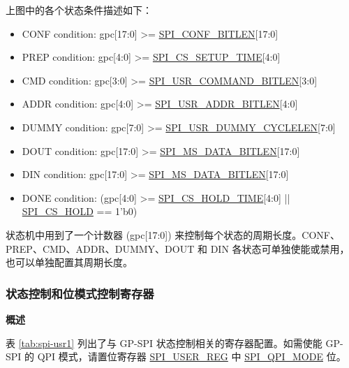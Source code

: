 \documentclass[main\_\_CN.tex]{subfiles}
\begin{document}
上图中的各个状态条件描述如下：
\begin{itemize}
    \item CONF condition: gpc[17:0] >= \hyperref[fielddesc:SPICONFBITLEN]{SPI\_CONF\_BITLEN}[17:0]
    \item PREP condition: gpc[4:0] >= \hyperref[fielddesc:SPICSSETUPTIME]{SPI\_CS\_SETUP\_TIME}[4:0]
    \item CMD condition: gpc[3:0] >= \hyperref[fielddesc:SPIUSRCOMMANDBITLEN]{SPI\_USR\_COMMAND\_BITLEN}[3:0]
    \item ADDR condition: gpc[4:0] >= \hyperref[fielddesc:SPIUSRADDRBITLEN]{SPI\_USR\_ADDR\_BITLEN}[4:0]
    \item DUMMY condition: gpc[7:0] >= \hyperref[fielddesc:SPIUSRDUMMYCYCLELEN]{SPI\_USR\_DUMMY\_CYCLELEN}[7:0]
    \item DOUT condition: gpc[17:0] >= \hyperref[fielddesc:SPIMSDATABITLEN]{SPI\_MS\_DATA\_BITLEN}[17:0]
    \item DIN condition: gpc[17:0] >= \hyperref[fielddesc:SPIMSDATABITLEN]{SPI\_MS\_DATA\_BITLEN}[17:0]
    
    \item DONE condition: (gpc[4:0] >= \hyperref[fielddesc:SPICSHOLDTIME]{SPI\_CS\_HOLD\_TIME}[4:0] || \hyperref[fielddesc:SPICSHOLD]{SPI\_CS\_HOLD} == 1'b0)
    
\end{itemize}

状态机中用到了一个计数器 (gpc[17:0]) 来控制每个状态的周期长度。CONF、PREP、CMD、ADDR、DUMMY、DOUT 和 DIN 各状态可单独使能或禁用，也可以单独配置其周期长度。 

\subsubsection{状态控制和位模式控制寄存器} \label{sec:gp-spi2-state-and-register-configuration}

\textbf{概述}

表 \ref{tab:spi-usr1} 列出了与 GP-SPI 状态控制相关的寄存器配置。如需使能 GP-SPI 的 QPI 模式，请置位寄存器 \hyperref[regdesc:SPIUSERREG]{SPI\_USER\_REG} 中 \hyperref[fielddesc:SPIQPIMODE]{SPI\_QPI\_MODE} 位。 
\end{document}
